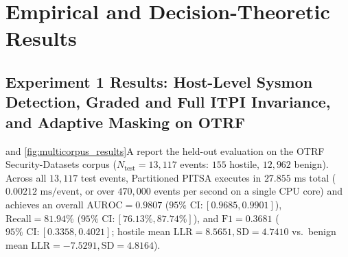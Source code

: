 \documentclass[11pt,a4paper]{article}
\begin{document}
\section{Empirical and Decision-Theoretic Results}
\label{sec:results}

\subsection{Experiment 1 Results: Host-Level Sysmon Detection, Graded and Full ITPI Invariance, and Adaptive Masking on OTRF}
\label{subsec:res_exp1}

 and \cref{fig:multicorpus_results}A report the held-out evaluation on the OTRF Security-Datasets corpus ($N_{\text{test}} = 13,117$ events: $155$ hostile, $12,962$ benign). Across all $13,117$ test events, Partitioned PITSA executes in $27.855\text{ ms}$ total ($0.00212\text{ ms/event}$, or over $470,000$ events per second on a single CPU core) and achieves an overall $\text{AUROC} = 0.9807$ ($95\%\text{ CI}: [0.9685, 0.9901]$), $\text{Recall} = 81.94\%$ ($95\%\text{ CI}: [76.13\%, 87.74\%]$), and $\text{F1} = 0.3681$ ($95\%\text{ CI}: [0.3358, 0.4021]$; hostile mean $\text{LLR} = 8.5651, \text{SD} = 4.7410$ vs.\ benign mean $\text{LLR} = -7.5291, \text{SD} = 4.8164$).
\end{document}
